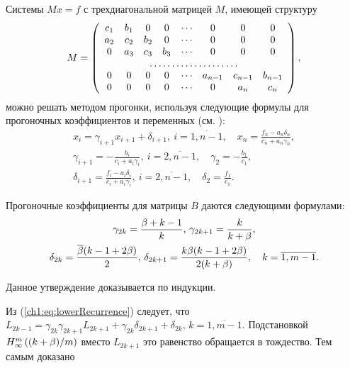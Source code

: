 {Системы $ Mx = f $ с трехдиагональной матрицей $ M $, имеющей структуру
\[
  M = \left(\begin{array}{cccccccc}
              c_1 & b_1 & 0   & 0   & \cdots & 0       & 0       & 0       \\
              a_2 & c_2 & b_2 & 0   & \cdots & 0       & 0       & 0       \\
              0   & a_3 & c_3 & b_3 & \cdots & 0       & 0       & 0       \\
              \hdotsfor{8}                                                 \\
              0   & 0   & 0   & 0   & \cdots & a_{n-1} & c_{n-1} & b_{n-1} \\
              0   & 0   & 0   & 0   & \cdots & 0       & a_n     & c_n
            \end{array}\right),
\]
можно решать методом прогонки, используя следующие формулы для
прогоночных коэффициентов и переменных (см. \cite{samarsky89}):
\begin{gather}
  \label{ch1:eq:tridiagonal-book}
  x_i = \gamma_{i+1} x_{i+1} + \delta_{i+1}, \: i = \overline{1,n-1},
  \quad
  x_n = \frac{f_n - a_n\delta_n}{c_n + a_n\gamma_n}, \\
  \gamma_{i+1} = -\frac{b_i}{c_i + a_i\gamma_i}, \: i = \overline{2,
    n-1}, \quad
  \gamma_2 = -\frac{b_1}{c_1}, \\
  \delta_{i+1} = \frac{f_i - a_i\delta_i}{c_i + a_i\gamma_i}, \: i =
  \overline{2, n-1}, \quad \delta_2 = \frac{f_1}{c_1}.
\end{gather}

\begin{proposition}
  \label{ch1:prop:tridiagonal:coefficients}
  Прогоночные коэффициенты для матрицы $B$ даются следующими
  формулами\textup{:}
  \begin{multline*}
    \gamma_{2k} = \frac{\beta+k-1}{k}, \,
    \gamma_{2k+1} = \frac{k}{k+\beta}, \\
    \delta_{2k} = \frac{\overline{\beta}(k-1+2\beta)}{2}, \, \delta_{2k+1} =
    \frac{k\beta(k-1+2\beta)}{2(k+\beta)}, \quad k = \overline{1,m-1}.
  \end{multline*}
\end{proposition}
Данное утверждение доказывается по индукции.

Из (\ref{ch1:eq:lowerRecurrence}) следует, что $L_{2k-1} =
\gamma_{2k}\gamma_{2k+1}L_{2k+1} + \gamma_{2k}\delta_{2k+1} +
\delta_{2k}, \, k = \overline{1, m-1}$. Подстановкой
$H_{\infty}^m\left({(k+\beta)/m}\right)$ вместо $L_{2k+1}$ это равенство обращается в
тождество. Тем самым доказано

}
